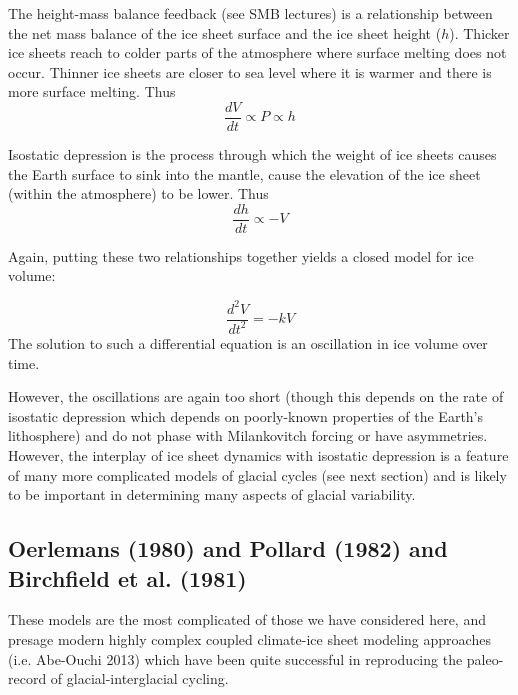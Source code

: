 \documentclass[12pt]{article}
\theoremstyle{definition}
\begin{document}
The height-mass balance feedback (see SMB lectures) is a relationship between the net mass balance of the ice sheet surface and the ice sheet height ($h$). Thicker ice sheets reach to colder parts of the atmosphere where surface melting does not occur. Thinner ice sheets are closer to sea level where it is warmer and there is more surface melting. Thus
\begin{equation}
\frac{dV}{dt} \propto P \propto h
\end{equation}

Isostatic depression is the process through which the weight of ice sheets causes the Earth surface to sink into the mantle, cause the elevation of the ice sheet (within the atmosphere) to be lower. Thus
\begin{equation}
\frac{dh}{dt} \propto -V
\end{equation}

Again, putting these two relationships together yields a closed model for ice volume:
\begin{shaded}
\begin{equation}
\frac{d^2V}{dt^2} = -k V
\end{equation}
The solution to such a differential equation is an oscillation in ice volume over time.
\end{shaded}
However, the oscillations are again too short (though this depends on the rate of isostatic depression which depends on poorly-known properties of the Earth's lithosphere) and do not phase with Milankovitch forcing or have asymmetries. However, the interplay of ice sheet dynamics with isostatic depression is a feature of many more complicated models of glacial cycles (see next section) and is likely to be important in determining many aspects of glacial variability.

\subsection{Oerlemans (1980) and Pollard (1982) and Birchfield et al. (1981)}
These models are the most complicated of those we have considered here, and presage modern highly complex coupled climate-ice sheet modeling approaches (i.e. Abe-Ouchi 2013) which have been quite successful in reproducing the paleo-record of glacial-interglacial cycling.
\end{document}
